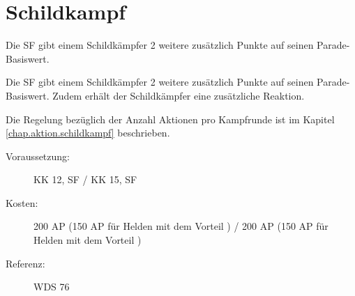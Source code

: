 \section{Schildkampf}
\label{sf.schildkampf}
Die SF  gibt einem Schildkämpfer 2 weitere zusätzlich Punkte auf seinen Parade-Basiswert.

Die SF  gibt einem Schildkämpfer 2 weitere zusätzlich Punkte auf seinen Parade-Basiswert.
Zudem erhält der Schildkämpfer eine zusätzliche Reaktion.

Die Regelung bezüglich der Anzahl Aktionen pro Kampfrunde ist im Kapitel \ref{chap.aktion.schildkampf} beschrieben.
\begin{description}
    \item[Voraussetzung:]
        KK 12, SF  / KK 15, SF 
    \item [Kosten:]
        200 AP (150 AP für Helden mit dem Vorteil ) / 200 AP (150 AP für Helden mit dem Vorteil )
    \item [Referenz:]
        WDS 76
\end{description}
